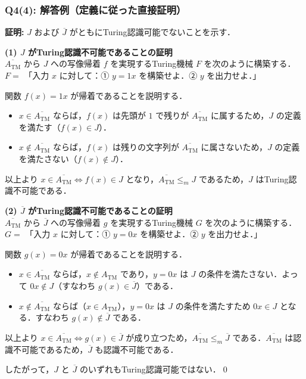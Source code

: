 \begin{frame}
\frametitle{Q4(4): 解答例（定義に従った直接証明）}

\textbf{証明:} $J$ および $\overline{J}$ がともにTuring認識可能でないことを示す．

\vspace{0.5em}
\textbf{(1) $J$ がTuring認識不可能であることの証明} \\
$\overline{A_{\mathrm{TM}}}$ から $J$ への写像帰着 $f$ を実現するTuring機械 $F$ を次のように構築する．\\
$F =$ 「入力 $x$ に対して：① $y = 1x$ を構築せよ．② $y$ を出力せよ．」

関数 $f(x) = 1x$ が帰着であることを説明する．
\begin{itemize}
    \item $x \in \overline{A_{\mathrm{TM}}}$ ならば，$f(x)$ は先頭が $1$ で残りが $\overline{A_{\mathrm{TM}}}$ に属するため，$J$ の定義を満たす（$f(x) \in J$）．
    \item $x \notin \overline{A_{\mathrm{TM}}}$ ならば，$f(x)$ は残りの文字列が $\overline{A_{\mathrm{TM}}}$ に属さないため，$J$ の定義を満たさない（$f(x) \notin J$）．
\end{itemize}
以上より $x \in \overline{A_{\mathrm{TM}}} \iff f(x) \in J$ となり，$\overline{A_{\mathrm{TM}}} \le_m J$ であるため，$J$ はTuring認識不可能である．

\framebreak

\textbf{(2) $\overline{J}$ がTuring認識不可能であることの証明} \\
$\overline{A_{\mathrm{TM}}}$ から $\overline{J}$ への写像帰着 $g$ を実現するTuring機械 $G$ を次のように構築する．\\
$G =$ 「入力 $x$ に対して：① $y = 0x$ を構築せよ．② $y$ を出力せよ．」

関数 $g(x) = 0x$ が帰着であることを説明する．
\begin{itemize}
    \item $x \in \overline{A_{\mathrm{TM}}}$ ならば，$x \notin A_{\mathrm{TM}}$ であり，$y = 0x$ は $J$ の条件を満たさない．よって $0x \notin J$（すなわち $g(x) \in \overline{J}$）である．
    \item $x \notin \overline{A_{\mathrm{TM}}}$ ならば（$x \in A_{\mathrm{TM}}$），$y = 0x$ は $J$ の条件を満たすため $0x \in J$ となる．すなわち $g(x) \notin \overline{J}$ である．
\end{itemize}
以上より $x \in \overline{A_{\mathrm{TM}}} \iff g(x) \in \overline{J}$ が成り立つため，$\overline{A_{\mathrm{TM}}} \le_m \overline{J}$ である．$\overline{A_{\mathrm{TM}}}$ は認識不可能であるため，$\overline{J}$ も認識不可能である．

\vspace{1em}
したがって，$J$ と $\overline{J}$ のいずれもTuring認識可能ではない．\qed
\end{frame}
